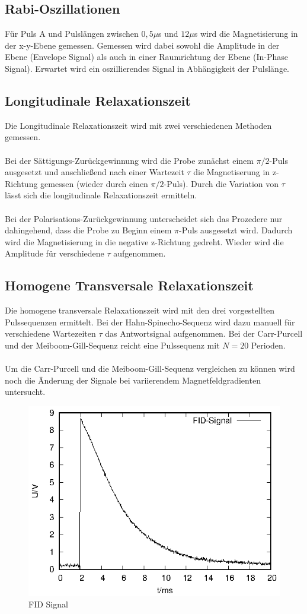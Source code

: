 \subsection{Rabi-Oszillationen}
Für Puls A und Pulslängen zwischen $0,5\mu$s und $12\mu$s wird die Magnetisierung in der x-y-Ebene gemessen. Gemessen wird dabei sowohl die Amplitude in der Ebene (Envelope Signal) als auch in einer Raumrichtung der Ebene (In-Phase Signal). Erwartet wird ein oszillierendes Signal in Abhängigkeit der Pulslänge. 

\subsection{Longitudinale Relaxationszeit}
Die Longitudinale Relaxationszeit wird mit zwei verschiedenen Methoden gemessen. \\ \\
Bei der Sättigungs-Zurückgewinnung wird die Probe zunächst einem $\pi/2$-Puls ausgesetzt und anschließend nach einer Wartezeit $\tau$ die Magnetiserung in z-Richtung gemessen (wieder durch einen $\pi/2$-Puls). Durch die Variation von $\tau$ lässt sich die longitudinale Relaxationszeit ermitteln. \\ \\
Bei der Polarisations-Zurückgewinnung unterscheidet sich das Prozedere nur dahingehend, dass die Probe zu Beginn einem $\pi$-Puls ausgesetzt wird. Dadurch wird die Magnetisierung in die negative z-Richtung gedreht. Wieder wird die Amplitude für verschiedene $\tau$ aufgenommen.

\subsection{Homogene Transversale Relaxationszeit}
Die homogene transversale Relaxationszeit wird mit den drei vorgestellten Pulssequenzen ermittelt. Bei der Hahn-Spinecho-Sequenz wird dazu manuell für verschiedene Wartezeiten $\tau$ das Antwortsignal aufgenommen. Bei der Carr-Purcell und der Meiboom-Gill-Sequenz reicht eine Pulssequenz mit $N=20$ Perioden.\\ \\
Um die Carr-Purcell und die Meiboom-Gill-Sequenz vergleichen zu können wird noch die Änderung der Signale bei variierendem Magnetfeldgradienten untersucht.

\begin{figure}[h]
  \centering
  \includegraphics[width=0.75\linewidth]{data/p402_443_data/FID_1/FID_1.eps}
  \caption{FID Signal}
  \label{fig:FID}
\end{figure}
